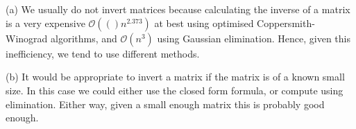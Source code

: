 \documentclass{article}
\renewcommand{\O}[1]{\mathcal{O}(#1)}
\begin{document}
\section{} %

\section{} %
 (a) We usually do not invert matrices because calculating the inverse of
a matrix is a very expensive $\O(n^2.373)$ at best using optimised
Coppersmith-Winograd algorithms, and $\O{n^3}$ using Gaussian elimination.
Hence, given this inefficiency, we tend to use different methods.

(b) It would be appropriate to invert a matrix if the matrix is of a known small
size. In this case we could either use the closed form formula, or compute using
elimination. Either way, given a small enough matrix this is probably good enough.

\section{} %
\end{document}

